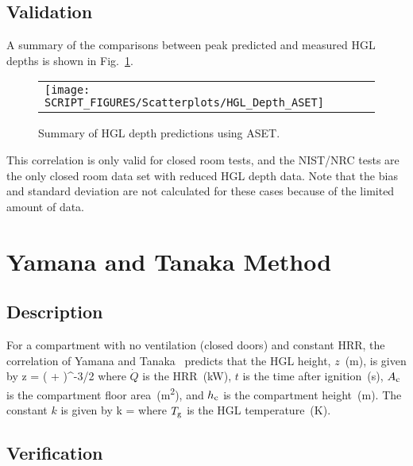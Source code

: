 \clearpage


\subsection*{Validation}

A summary of the comparisons between peak predicted and measured HGL depths is shown in Fig.~\ref{HGL_Depth_ASET}.

\begin{figure}[!ht]
\begin{center}
\begin{tabular}{l}
\texttt{[image: SCRIPT\_FIGURES/Scatterplots/HGL\_Depth\_ASET]}
\end{tabular}
\end{center}
\caption[Summary of HGL depth predictions (ASET)]
{Summary of HGL depth predictions using ASET.}
\label{HGL_Depth_ASET}
\end{figure}

This correlation is only valid for closed room tests, and the NIST/NRC tests are the only closed room data set with reduced HGL depth data. Note that the bias and standard deviation are not calculated for these cases because of the limited amount of data.


\clearpage


\section{Yamana and Tanaka Method}
\label{sec:YT}

\subsection*{Description}

For a compartment with no ventilation (closed doors) and constant HRR, the correlation of Yamana and Tanaka~\cite{Tanaka:1} predicts that the HGL height, $z$~(\si{m}), is given by
\be
z = \left(  +  \right)^{-3/2}
\label{eq:Yamana_Tanaka}
\ee
where $\dot Q$ is the HRR~(\si{kW}), $t$ is the time after ignition~(\si{s}), $A\sb{c}$ is the compartment floor area~(\si{m^2}), and $h\sb{c}$ is the compartment height~(\si{m}). The constant $k$ is given by
\be
k = 
\ee
where $T\sb{g}$ is the HGL temperature~(\si{K}).


\clearpage


\subsection*{Verification}

